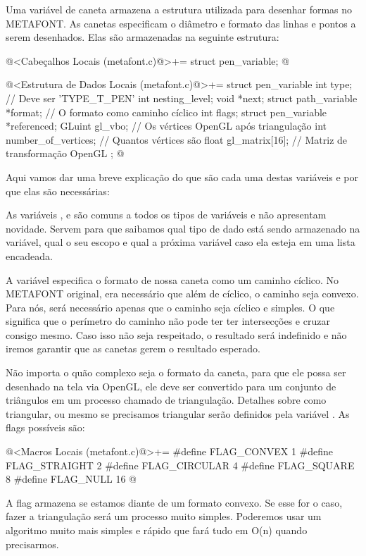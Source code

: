 
Uma variável de caneta armazena a estrutura utilizada para desenhar
formas no METAFONT. As canetas especificam o diâmetro e formato das
linhas e pontos a serem desenhados. Elas são armazenadas na seguinte
estrutura:

\iniciocodigo
@<Cabeçalhos Locais (metafont.c)@>+=
struct pen_variable;
@
\fimcodigo

\iniciocodigo
@<Estrutura de Dados Locais (metafont.c)@>+=
struct pen_variable{
  int type; // Deve ser 'TYPE_T_PEN'
  int nesting_level;
  void *next;
  struct path_variable *format; // O formato como caminho cíclico
  int flags;
  struct pen_variable *referenced;
  GLuint gl_vbo; // Os vértices OpenGL após triangulação
  int number_of_vertices; // Quantos vértices são
  float gl_matrix[16]; // Matriz de transformação OpenGL
};
@
\fimcodigo

Aqui vamos dar uma breve explicação do que são cada uma destas
variáveis e por que elas são necessárias:

As variáveis , 
e  são comuns a todos os tipos de variáveis e não
apresentam novidade. Servem para que saibamos qual tipo de dado está
sendo armazenado na variável, qual o seu escopo e qual a próxima
variável caso ela esteja em uma lista encadeada.

A variável  especifica o formato de nossa caneta
como um caminho cíclico. No METAFONT original, era necessário que além
de cíclico, o caminho seja convexo. Para nós, será necessário apenas
que o caminho seja cíclico e simples. O que significa que o perímetro
do caminho não pode ter ter intersecções e cruzar consigo mesmo. Caso
isso não seja respeitado, o resultado será indefinido e não iremos
garantir que as canetas gerem o resultado esperado.

Não importa o quão complexo seja o formato da caneta, para que ele
possa ser desenhado na tela via OpenGL, ele deve ser convertido para
um conjunto de triângulos em um processo chamado de
triangulação. Detalhes sobre como triangular, ou mesmo se precisamos
triangular serão definidos pela variável . As flags
possíveis são:

\iniciocodigo
@<Macros Locais (metafont.c)@>+=
#define FLAG_CONVEX   1
#define FLAG_STRAIGHT 2
#define FLAG_CIRCULAR 4
#define FLAG_SQUARE   8
#define FLAG_NULL    16
@
\fimcodigo


A flag  armazena se estamos diante de um
formato convexo. Se esse for o caso, fazer a triangulação será um
processo muito simples. Poderemos usar um algoritmo muito mais simples
e rápido que fará tudo em O(n) quando precisarmos.

